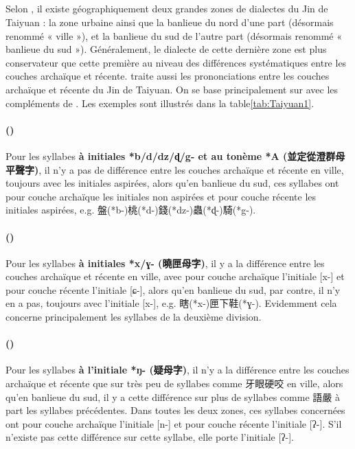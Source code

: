 \documentclass{scrbook}
\newcounter{c}[subsubsection]
\newcommand{\stpc}[1]{\stepcounter{#1}}
\newcommand{\difwenbai}{couches archaïque et récente\xspace}
\newcommand{\illustre}{Les exemples sont illustrés dans la table\xspace}
\newcommand{\termyyx}[1]{\textbf{#1}}
\begin{document}
\begin{sloppypar}
\subsection{\MakeCapital{\difwenbai}}
Selon \textcite[3--5]{Shen1994Taiyuan}, il existe géographiquement deux grandes zones de dialectes du Jin de Taiyuan : la zone urbaine ainsi que la banlieue du nord d'une part (désormais renommé « ville »), et la banlieue du sud de l'autre part (désormais renommé « banlieue du sud »). Généralement, le dialecte de cette dernière zone est plus conservateur que cette première au niveau des différences systématiques entre les \difwenbai. \textcite{Wang1958Taiyuan} traite aussi les prononciations entre les \difwenbai du Jin de Taiyuan. On se base principalement sur \textcite[3--5]{Shen1994Taiyuan} avec les compléments de \textcite{Wang1958Taiyuan}. \illustre \ref{tab:Taiyuan1}. 

\stpc{c}\paragraph{()}
Pour les syllabes \termyyx{à initiales *b/d/dz/ɖ/g- et au tonème *A (並定從澄群母平聲字)}, il n'y a pas de différence entre les \difwenbai en ville, toujours avec les initiales aspirées, alors qu'en banlieue du sud, ces syllabes ont pour couche archaïque les initiales non aspirées et pour couche récente les initiales aspirées, e.g. 盤(*b-)桃(*d-)錢(*dz-)蟲(*ɖ-)騎(*g-).

\stpc{c}\paragraph{()}
Pour les syllabes \termyyx{à initiales *x/ɣ- (曉匣母字)}, il y a la différence entre les \difwenbai en ville, avec pour couche archaïque l'initiale [x-] et pour couche récente l'initiale [ɕ-], alors qu'en banlieue du sud, par contre, il n'y en a pas, toujours avec l'initiale [x-], e.g. 瞎(*x-)匣下鞋(*ɣ-). Evidemment cela concerne principalement les syllabes de la deuxième division.

\stpc{c}\paragraph{()}
Pour les syllabes \termyyx{à l'initiale *ŋ- (疑母字)}, il n'y a la différence entre les \difwenbai que sur très peu de syllabes comme 牙眼硬咬 en ville, alors qu'en banlieue du sud, il y a cette différence sur plus de syllabes comme 語嚴 à part les syllabes précédentes. Dans toutes les deux zones, ces syllabes concernées ont pour couche archaïque l'initiale [n-] et pour couche récente l'initiale [ʔ-]. S'il n'existe pas cette différence sur cette syllabe, elle porte l'initiale [ʔ-].


\end{sloppypar}
\end{document}
